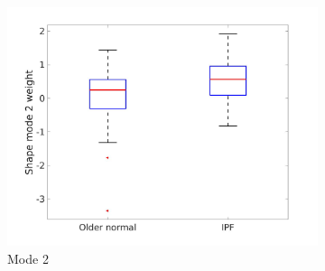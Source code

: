\begin{figure}[htbp]
\begin{subfigure}{.6\linewidth}
  \includegraphics[width=\linewidth,trim={{.0\wd0} {.0\wd0} {.0\wd0} {.0\wd0}},clip]{QuantitativeAnalysis/Image/BoxPlot_Mode2.jpg}
  \caption{Mode 2}
  \label{fig:ShapeDifference-b}
\end{subfigure}
\begin{subfigure}{.6\linewidth}%

\end{subfigure}
\end{figure}
